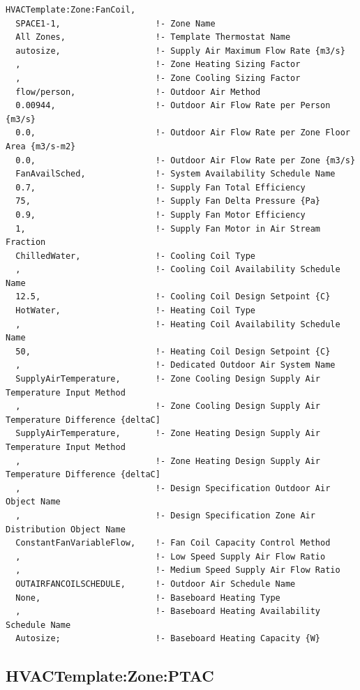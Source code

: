 \begin{lstlisting}
HVACTemplate:Zone:FanCoil,
  SPACE1-1,                   !- Zone Name
  All Zones,                  !- Template Thermostat Name
  autosize,                   !- Supply Air Maximum Flow Rate {m3/s}
  ,                           !- Zone Heating Sizing Factor
  ,                           !- Zone Cooling Sizing Factor
  flow/person,                !- Outdoor Air Method
  0.00944,                    !- Outdoor Air Flow Rate per Person {m3/s}
  0.0,                        !- Outdoor Air Flow Rate per Zone Floor Area {m3/s-m2}
  0.0,                        !- Outdoor Air Flow Rate per Zone {m3/s}
  FanAvailSched,              !- System Availability Schedule Name
  0.7,                        !- Supply Fan Total Efficiency
  75,                         !- Supply Fan Delta Pressure {Pa}
  0.9,                        !- Supply Fan Motor Efficiency
  1,                          !- Supply Fan Motor in Air Stream Fraction
  ChilledWater,               !- Cooling Coil Type
  ,                           !- Cooling Coil Availability Schedule Name
  12.5,                       !- Cooling Coil Design Setpoint {C}
  HotWater,                   !- Heating Coil Type
  ,                           !- Heating Coil Availability Schedule Name
  50,                         !- Heating Coil Design Setpoint {C}
  ,                           !- Dedicated Outdoor Air System Name
  SupplyAirTemperature,       !- Zone Cooling Design Supply Air Temperature Input Method
  ,                           !- Zone Cooling Design Supply Air Temperature Difference {deltaC]
  SupplyAirTemperature,       !- Zone Heating Design Supply Air Temperature Input Method
  ,                           !- Zone Heating Design Supply Air Temperature Difference {deltaC]
  ,                           !- Design Specification Outdoor Air Object Name
  ,                           !- Design Specification Zone Air Distribution Object Name
  ConstantFanVariableFlow,    !- Fan Coil Capacity Control Method
  ,                           !- Low Speed Supply Air Flow Ratio
  ,                           !- Medium Speed Supply Air Flow Ratio
  OUTAIRFANCOILSCHEDULE,      !- Outdoor Air Schedule Name
  None,                       !- Baseboard Heating Type
  ,                           !- Baseboard Heating Availability Schedule Name
  Autosize;                   !- Baseboard Heating Capacity {W}
\end{lstlisting}

\subsection{HVACTemplate:Zone:PTAC}\label{hvactemplatezoneptac}

